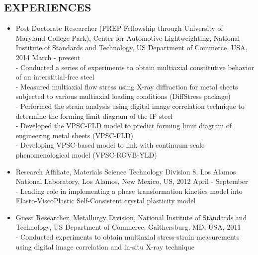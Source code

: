 \documentclass{res}
\begin{document}
\begin{resume}
  \section{EXPERIENCES}
  \begin{itemize}
  \item Post Doctorate Researcher (PREP Fellowship through University of Maryland College Park), Center for Automotive Lightweighting,
    National Institute of Standards and Technology, US Department of Commerce, USA, 2014 March - present\\
    - Conducted a series of experiments to obtain multiaxial constitutive behavior of an interstitial-free steel\\
    - Measured multiaxial flow stress using X-ray diffraction for metal sheets subjected to various multiaxial loading conditions (DiffStress package)\\
    - Performed the strain analysis using digital image correlation technique to determine the forming limit diagram of the IF steel\\
    - Developed the VPSC-FLD model to predict forming limit diagram of engineering metal sheets (VPSC-FLD)\\
    - Developing VPSC-based model to link with continuum-scale phenomenological model (VPSC-RGVB-YLD)
  \item Research Affiliate, Materials Science Technology Division 8, Los Alamos National Laboratory, Los Alamos, New Mexico, US, 2012 April - September \\
    - Leading role in implementing a phase transformation kinetics model into Elasto-ViscoPlastic Self-Consistent crystal plasticity model
  \item Guest Researcher, Metallurgy Division, National Institute of Standards and Technology, US Department of Commerce, Gaithersburg, MD, USA, 2011\\
    - Conducted experiments to obtain multiaxial stress-strain measurements using digital image correlation and in-situ X-ray technique
  \end{itemize}


\end{resume}
\end{document}
